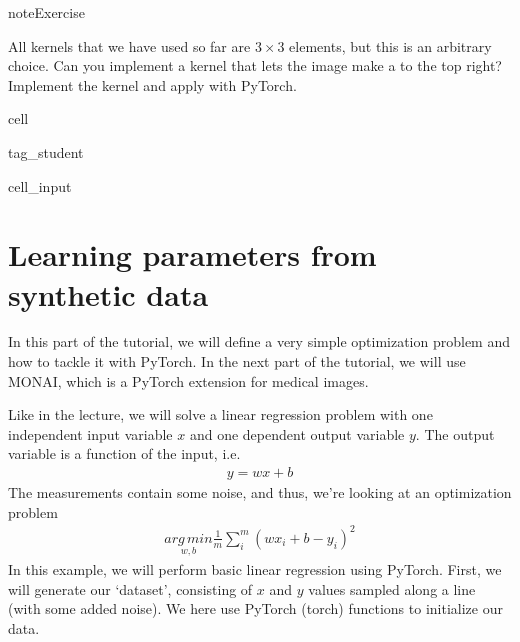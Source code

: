 \documentclass[letterpaper,10pt,english]{jupyterBook}
\begin{document}
\begin{sphinxadmonition}{note}{Exercise}

\sphinxAtStartPar
All kernels that we have used so far are \(3\times 3\) elements, but this is an arbitrary choice. Can you implement a kernel that lets the image make a  to the top right? Implement the kernel and apply with PyTorch.
\end{sphinxadmonition}

\begin{sphinxuseclass}{cell}
\begin{sphinxuseclass}{tag_student}\begin{sphinxVerbatimInput}

\begin{sphinxuseclass}{cell_input}
\begin{sphinxVerbatim}[commandchars=\\\{\}]
\end{sphinxVerbatim}

\end{sphinxuseclass}\end{sphinxVerbatimInput}

\end{sphinxuseclass}
\end{sphinxuseclass}

\chapter{Learning parameters from synthetic data}
\label{\detokenize{notebooks/Tutorial2_ConvolutionalNeuralNetworks/Tutorial2_ConvolutionalNeuralNetworks_student:learning-parameters-from-synthetic-data}}
\sphinxAtStartPar
In this part of the tutorial, we will define a very simple optimization problem and how to tackle it with PyTorch.
In the next part of the tutorial, we will use MONAI, which is a PyTorch extension for medical images.

\sphinxAtStartPar
Like in the lecture, we will solve a linear regression problem with one independent input variable \(x\) and one
dependent output variable \(y\). The output variable is a function of the input, i.e.
\begin{equation*}
\begin{split}y = wx + b\end{split}
\end{equation*}
\sphinxAtStartPar
The measurements contain some noise, and thus, we’re looking at an optimization problem
\begin{equation*}
\begin{split}\underset{w,b}{arg\,min}\frac{1}{m}\sum_{i}^m (wx_i+b-y_i)^2\end{split}
\end{equation*}
\sphinxAtStartPar
In this example, we will perform basic linear regression using PyTorch.
First, we will generate our ‘dataset’, consisting of \(x\) and \(y\) values sampled along a line (with some added noise).
We here use PyTorch (torch) functions to initialize our data.
\end{document}
